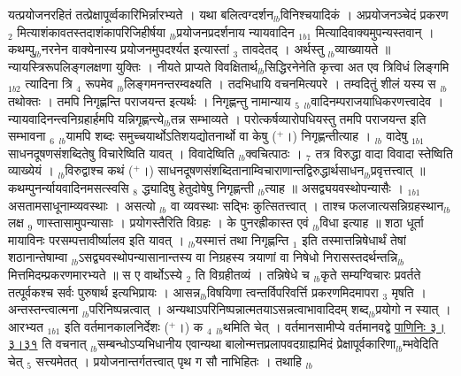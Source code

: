 \documentclass[article,12pt,a4paper]{memoir}%
\newcommand{\add}[1]{($^{+}$#1)}
\begin{document}
	  
	  \pstart \leavevmode%
	यत्प्रयोजनरहितं तत्प्रेक्षापूर्व्वकारिभिर्न्नारभ्यते । यथा बलित्वग्दर्शन{\tiny $_{lb}$}विनिश्चयादिकं । अप्रयोजनञ्चेदं प्रकरण {\tiny $_{2}$} मित्याशंकावतस्तदाशंकापरिजिहीर्षया {\tiny $_{lb}$}प्रयोजनप्रदर्शनाय {\color{DodgerBlue3}न्यायवादिन} {\tiny $_{1b1}$} मित्यादिवाक्यमुपन्यस्तवान् । कथम्पु{\tiny $_{lb}$}नरनेन वाक्येनास्य प्रयोजनमुपदर्श्यत इत्यास्तां {\tiny $_{3}$} तावदेतद् । अर्थस्तु {\tiny $_{lb}$}व्याख्यायते ॥ न्यायस्त्रिरूपलिङ्गलक्षणा युक्तिः । नीयते प्राप्यते विवक्षितार्थ{\tiny $_{lb}$}सिद्धिरनेनेति कृत्त्वा अत एव {\color{DodgerBlue3}त्रिविधं लिङ्गमि}{\tiny $_{1b2}$} त्यादिना त्रि {\tiny $_{4}$} रूपमेव {\tiny $_{lb}$}लिङ्गमनन्तरम्वक्ष्यति । तदभिधायि वचनमित्यपरे । तम्वदितुं शीलं यस्य स {\tiny $_{lb}$}तथोक्तः । तमपि निगृह्णन्ति पराजयन्त इत्यर्थः । निगृह्णन्तु नामान्याय {\tiny $_{5}$} {\tiny $_{lb}$}वादिनम्पराजयाधिकरणत्त्वादेव । न्यायवादिनन्त्वनिग्रहार्हमपि यन्निगृह्णन्त्ये{\tiny $_{lb}$}तन्न सम्भाव्यते । परोत्कर्षव्यारोपधियस्तु तमपि पराजयन्त इति सम्भावना {\tiny $_{6}$} {\tiny $_{lb}$}यामपि शब्दः समुच्चयार्थोऽतिशयद्योतनार्थो वा केषु \add{।} निगृह्णन्तीत्याह । {\tiny $_{lb}$} {\color{DodgerBlue3}वादेषु} {\tiny $_{1b1}$} साधनदूषणसंशब्दितेषु विचारेष्विति यावत् । {\color{DodgerBlue3}विवादेष्विति} {\tiny $_{lb}$}क्वचित्पाठः । {\tiny $_{7}$} तत्र विरुद्धा वादा {\color{DodgerBlue3}विवादा} स्तेष्विति व्याख्येयं । {\tiny $_{lb}$}विरुद्वाश्च कथं \add{।} साधनदूषणसंशब्दितानाम्विचाराणान्तद्विरुद्धार्थसाधन{\tiny $_{lb}$}प्रवृत्तत्त्वात् ॥ कथम्पुनर्न्यायवादिनमसत्स्वसि {\tiny $_{8}$} द्ध्यादिषु हेतुदोषेषु निगृह्णन्ती {\tiny $_{lb}$}त्याह ॥ {\color{DodgerBlue3}असद्व्ययवस्थोपन्यासैः} । {\tiny $_{1b1}$} असतामसाधूनाम्व्यवस्थाः । असत्यो {\tiny $_{lb}$} \leavevmode{} वा व्यवस्थाः सद्भिः कुत्सितत्त्वात् । ताश्च फलजात्यसन्निग्रहस्थान{\tiny $_{lb}$}लक्ष {\tiny $_{9}$}\leavevmode{} णास्तासामुपन्यासाः । प्रयोगस्तैरिति विग्रहः । के पुनरह्रीकास्त एवं {\tiny $_{lb}$}विधा इत्याह ॥ शठा धूर्ता मायाविनः परसम्पत्तावीर्ष्यालव इति यावत् । {\tiny $_{lb}$}यस्मात्तं तथा निगृह्णन्ति {\tiny $_{1}$} इति तस्मात्तन्निषेधार्थं तेषां शठानान्तेषाम्वा {\tiny $_{lb}$}ऽसद्व्यवस्थोपन्यासानान्तस्य {\color{DodgerBlue3}वा} निग्रहस्य त्रयाणां {\color{DodgerBlue3}वा} निषेधो निरासस्तदर्थन्तन्नि{\tiny $_{lb}$}मित्तमिदम्प्रकरणमारभ्यते ॥ {\color{DodgerBlue3}स ए} वार्थोऽस्ये {\tiny $_{2}$} ति विग्रहीतव्यं । तन्निषेधे च {\tiny $_{lb}$}कृते सम्यग्विचारः प्रवर्तते तत्पूर्वकश्च सर्वः पुरुषार्थ इत्यभिप्रायः । आसन्न{\tiny $_{lb}$}विषयिणा त्वन्तर्विपरिवर्त्ति प्रकरणमिदमापरा {\tiny $_{3}$} मृषति । अन्तस्तन्त्वात्मना {\tiny $_{lb}$}परिनिष्पन्नत्वात् । अन्यथाऽपरिनिष्पन्नात्मतयाऽसन्नत्वाभावादिदम् शब्द{\tiny $_{lb}$}प्रयोगो न स्यात् । {\color{DodgerBlue3}आरभ्यत} {\tiny $_{1b1}$} इति वर्तमानकालनिर्देशः \add{।} {\color{DodgerBlue3}क {\tiny $_{4}$}} {\tiny $_{lb}$}थमिति चेत् । वर्तमानसामीप्ये वर्तमानवद्वे \href{http://sarit.indology.info/?cref=P\%C4\%81.3.3.31}{पाणिनिः ३।३।३१} ति वचनात् {\tiny $_{lb}$}सम्बन्धोऽप्यभिधानीय एवान्यथा बालोन्मत्तप्रलापवदग्राह्यमिदं प्रेक्षापूर्वकारिणा{\tiny $_{lb}$}म्भवेदिति चेत् {\tiny $_{5}$} सत्त्यमेतत् । प्रयोजनान्तर्गतत्त्वात् पृथ {\color{DodgerBlue3}ग} सौ नाभिहितः । तथाहि {\tiny $_{lb}$} 
\end{document}
